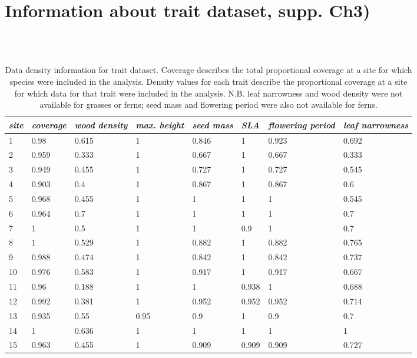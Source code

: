 \chapter[Appendix 2b (Information about trait dataset, supp. Ch3)]{Information about trait dataset, supp. Ch3)}

\begin{landscape}
\begin{table}[ht]
\tiny
\centering
\caption[Data density information for trait dataset.]{\small{Data density information for trait dataset. Coverage describes the total proportional coverage at a site for which species were included in the analysis. Density values for each trait describe the proportional coverage at a site for which data for that trait were included in the analysis. N.B. leaf narrowness and wood density were not available for grasses or ferns; seed mass and flowering period were also not available for ferns.}} \\
\label{Ch3sup2_T1} \\
{\tabulinesep=1.2mm
\begin{tabu} to \linewidth {XXXXXXXX}
\hline
\textit{site} & \textit{coverage} & \textit{wood density} & \textit{max. height} & \textit{seed mass} & \textit{SLA} & \textit{flowering period} & \textit{leaf narrowness} \\
 & 0.98 & 0.615 & 1 & 0.846 & 1 & 0.923 & 0.692 \\
2 & 0.959 & 0.333 & 1 & 0.667 & 1 & 0.667 & 0.333 \\
3 & 0.949 & 0.455 & 1 & 0.727 & 1 & 0.727 & 0.545 \\
4 & 0.903 & 0.4 & 1 & 0.867 & 1 & 0.867 & 0.6 \\
5 & 0.968 & 0.455 & 1 & 1 & 1 & 1 & 0.545 \\
6 & 0.964 & 0.7 & 1 & 1 & 1 & 1 & 0.7 \\
7 & 1 & 0.5 & 1 & 1 & 0.9 & 1 & 0.7 \\
8 & 1 & 0.529 & 1 & 0.882 & 1 & 0.882 & 0.765 \\
9 & 0.988 & 0.474 & 1 & 0.842 & 1 & 0.842 & 0.737 \\
10 & 0.976 & 0.583 & 1 & 0.917 & 1 & 0.917 & 0.667 \\
11 & 0.96 & 0.188 & 1 & 1 & 0.938 & 1 & 0.688 \\
12 & 0.992 & 0.381 & 1 & 0.952 & 0.952 & 0.952 & 0.714 \\
13 & 0.935 & 0.55 & 0.95 & 0.9 & 1 & 0.9 & 0.7 \\
14 & 1 & 0.636 & 1 & 1 & 1 & 1 & 1 \\
15 & 0.963 & 0.455 & 1 & 0.909 & 0.909 & 0.909 & 0.727 \\
\hline
\end{tabu}}
\end{table}
\end{landscape}
\clearpage

